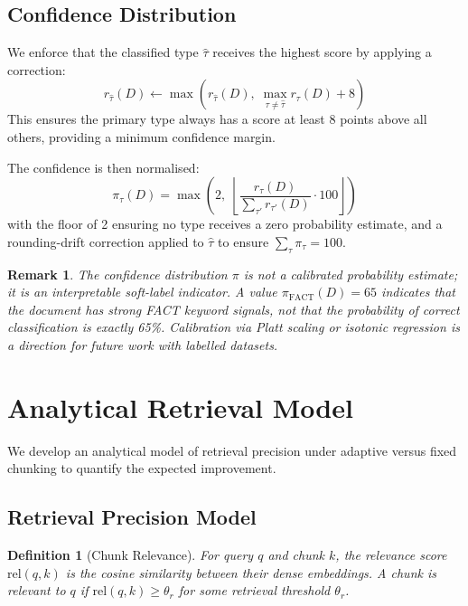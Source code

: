 \documentclass[conference]{IEEEtran}
\newtheorem{definition}{Definition}
\newtheorem{remark}{Remark}
\begin{document}
\subsection{Confidence Distribution}

We enforce that the classified type $\hat{\tau}$ receives
the highest score by applying a correction:
\begin{equation}
  r_{\hat{\tau}}(D) \leftarrow
    \max\!\left(r_{\hat{\tau}}(D),\;
    \max_{\tau \neq \hat{\tau}} r_\tau(D) + 8\right)
  \label{eq:correction}
\end{equation}
This ensures the primary type always has a score at least
8 points above all others, providing a minimum confidence
margin.

The confidence is then normalised:
\begin{equation}
  \pi_\tau(D) = \max\!\left(2,\;
    \left\lfloor\frac{r_\tau(D)}{\sum_{\tau'} r_{\tau'}(D)}
    \cdot 100\right\rfloor\right)
  \label{eq:confidence}
\end{equation}
with the floor of 2 ensuring no type receives a zero
probability estimate, and a rounding-drift correction
applied to $\hat{\tau}$ to ensure $\sum_\tau \pi_\tau = 100$.

\begin{remark}
The confidence distribution $\pi$ is not a calibrated
probability estimate; it is an interpretable soft-label
indicator. A value $\pi_{\text{FACT}}(D) = 65$ indicates
that the document has strong FACT keyword signals, not
that the probability of correct classification is exactly
65\%. Calibration via Platt scaling or isotonic regression
\cite{baeza1999modern} is a direction for future work with
labelled datasets.
\end{remark}

\section{Analytical Retrieval Model}
\label{sec:analysis}

We develop an analytical model of retrieval precision under
adaptive versus fixed chunking to quantify the expected
improvement.

\subsection{Retrieval Precision Model}

\begin{definition}[Chunk Relevance]
\label{def:relevance}
For query $q$ and chunk $k$, the relevance score
$\text{rel}(q, k)$ is the cosine similarity between
their dense embeddings. A chunk is \emph{relevant} to
$q$ if $\text{rel}(q, k) \geq \theta_r$ for some
retrieval threshold $\theta_r$.
\end{definition}
\end{document}
